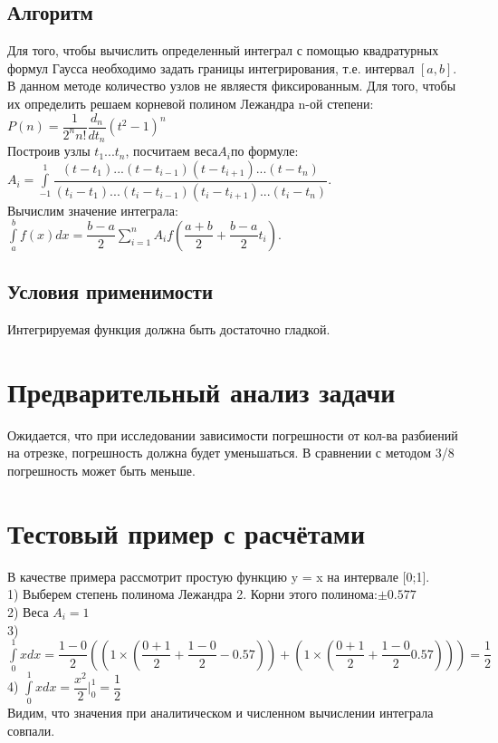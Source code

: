 \documentclass[a4paper]{article}
\begin{document}
\subsection{Алгоритм}
Для того, чтобы вычислить определенный интеграл с помощью квадратурных формул Гаусса необходимо задать границы интегрирования, т.е. интервал $[a,b]$. В данном методе количество узлов не являестя фиксированным. Для того, чтобы их определить решаем корневой полином Лежандра n-ой степени:\\$P(n)=\dfrac{1}{2^nn!}\dfrac{d_n}{dt_n}(t^2-1)^n$\\ Построив узлы $t_1...t_n$, посчитаем веса$A_i$по формуле:\\$A_i=\int\limits_{-1}^1 \dfrac{(t-t_1)...(t-t_{i-1})(t-t_{i+1})...(t-t_n)}{(t_i-t_1)...(t_i-t_{i-1})(t_i-t_{i+1})...(t_i-t_n)}$.\\ Вычислим значение интеграла:\\ 
 $ \int\limits_a^b f(x)dx= \dfrac{b-a}{2}\sum_{i=1}^n A_if(\dfrac{a+b}{2}+\dfrac{b-a}{2}t_i)$.

\subsection{Условия применимости}
Интегрируемая функция должна быть достаточно гладкой.
 
\section{Предварительный анализ задачи} 
Ожидается, что при исследовании зависимости погрешности от кол-ва разбиений на отрезке, погрешность должна будет уменьшаться. В сравнении с методом 3/8 погрешность может быть меньше.
\section{Тестовый пример с расчётами} 
В качестве примера рассмотрит простую функцию y = x на интервале [0;1].\\
1) Выберем степень полинома Лежандра 2. Корни этого полинома:$\pm 0.577$\\
2) Веса $A_i = 1$\\
3) $ \int\limits_0^1 xdx = \dfrac{1-0}{2}((1	
\times(\dfrac{0+1}{2}+\dfrac{1-0}{2}-0.57))+(1	
\times(\dfrac{0+1}{2}+\dfrac{1-0}{2}0.57)))=\dfrac{1}{2} $\\
4) $ \int\limits_0^1 xdx  = \dfrac{x^2}{2} |^{1} _{0}=\dfrac{1}{2}$\\
Видим, что значения при аналитическом и численном вычислении интеграла совпали.
\end{document}
